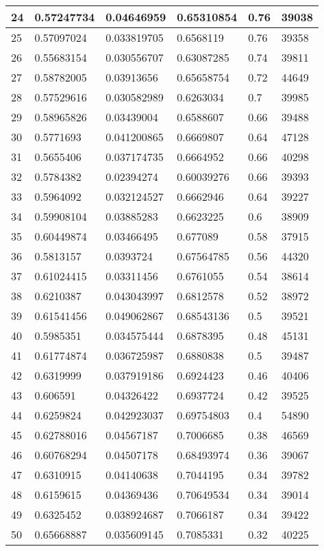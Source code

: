 \begin{longtable}{|l|l|l|l|l|l|}
24 & 0.57247734 & 0.04646959 & 0.65310854 & 0.76 & 39038 \\ \hline 
25 & 0.57097024 & 0.033819705 & 0.6568119 & 0.76 & 39358 \\ \hline 
26 & 0.55683154 & 0.030556707 & 0.63087285 & 0.74 & 39811 \\ \hline 
27 & 0.58782005 & 0.03913656 & 0.65658754 & 0.72 & 44649 \\ \hline 
28 & 0.57529616 & 0.030582989 & 0.6263034 & 0.7 & 39985 \\ \hline 
29 & 0.58965826 & 0.03439004 & 0.6588607 & 0.66 & 39488 \\ \hline 
30 & 0.5771693 & 0.041200865 & 0.6669807 & 0.64 & 47128 \\ \hline 
31 & 0.5655406 & 0.037174735 & 0.6664952 & 0.66 & 40298 \\ \hline 
32 & 0.5784382 & 0.02394274 & 0.60039276 & 0.66 & 39393 \\ \hline 
33 & 0.5964092 & 0.032124527 & 0.6662946 & 0.64 & 39227 \\ \hline 
34 & 0.59908104 & 0.03885283 & 0.6623225 & 0.6 & 38909 \\ \hline 
35 & 0.60449874 & 0.03466495 & 0.677089 & 0.58 & 37915 \\ \hline 
36 & 0.5813157 & 0.0393724 & 0.67564785 & 0.56 & 44320 \\ \hline 
37 & 0.61024415 & 0.03311456 & 0.6761055 & 0.54 & 38614 \\ \hline 
38 & 0.6210387 & 0.043043997 & 0.6812578 & 0.52 & 38972 \\ \hline 
39 & 0.61541456 & 0.049062867 & 0.68543136 & 0.5 & 39521 \\ \hline 
40 & 0.5985351 & 0.034575444 & 0.6878395 & 0.48 & 45131 \\ \hline 
41 & 0.61774874 & 0.036725987 & 0.6880838 & 0.5 & 39487 \\ \hline 
42 & 0.6319999 & 0.037919186 & 0.6924423 & 0.46 & 40406 \\ \hline 
43 & 0.606591 & 0.04326422 & 0.6937724 & 0.42 & 39525 \\ \hline 
44 & 0.6259824 & 0.042923037 & 0.69754803 & 0.4 & 54890 \\ \hline 
45 & 0.62788016 & 0.04567187 & 0.7006685 & 0.38 & 46569 \\ \hline 
46 & 0.60768294 & 0.04507178 & 0.68493974 & 0.36 & 39067 \\ \hline 
47 & 0.6310915 & 0.04140638 & 0.7044195 & 0.34 & 39782 \\ \hline 
48 & 0.6159615 & 0.04369436 & 0.70649534 & 0.34 & 39014 \\ \hline 
49 & 0.6325452 & 0.038924687 & 0.7066187 & 0.34 & 39422 \\ \hline 
50 & 0.65668887 & 0.035609145 & 0.7085331 & 0.32 & 40225 \\ \hline 
\end{longtable}